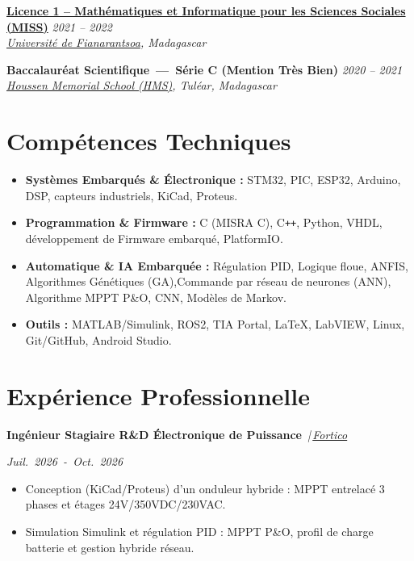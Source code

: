 \documentclass[10pt, a4paper]{article}
\newcommand{\cventry}[4]{%
    \noindent\textbf{#1} \hfill \textit{#2} \\
    \textit{#3} \hfill {\footnotesize #4} \vspace{0.2ex}
}
\newcommand{\experience}[3]{%
    \noindent
    \parbox[t]{0.72\textwidth}{\textbf{#1} \textit{\,|\,#2}}%
    \hfill
    \parbox[t]{0.26\textwidth}{\raggedleft\normalfont\itshape\mbox{#3}}%
    \par\vspace{0.2ex}
}
\begin{document}
\cventry{\href{https://facsciences.univ-fianarantsoa.mg/fr/formations/parcours/vorhf2gwn3pfzqta7w2pff6p}{Licence 1 -- Mathématiques et Informatique pour les Sciences Sociales (MISS)}}{2021 -- 2022}
{\href{https://www.univ-fianarantsoa.mg/}{Université de Fianarantsoa}, Madagascar}{}
\vspace{0.6ex}

\cventry{\textcolor{primary}{Baccalauréat Scientifique\ \textbf{---}\ Série C \textnormal{(Mention Très Bien)}}}{2020 -- 2021}
{\href{https://www.facebook.com/p/Coll\%C3\%A8ge-Priv\%C3\%A9-Houssen-Memorial-School-61557463046217/}{Houssen Memorial School (HMS)}, Tuléar, Madagascar}{}






\section*{Compétences Techniques}
\begin{itemize}[leftmargin=*, itemsep=0.2ex, parsep=0pt]
	\item \textbf{Systèmes Embarqués \& Électronique :} STM32, PIC, ESP32, Arduino, DSP, capteurs industriels, KiCad, Proteus.
	\item \textbf{Programmation \& Firmware :} C (MISRA C), C\texttt{++}, Python, VHDL, développement de Firmware embarqué, PlatformIO.
	\item \textbf{Automatique \& IA Embarquée :} Régulation PID, Logique floue, ANFIS, Algorithmes Génétiques (GA),Commande par réseau de neurones (ANN), Algorithme MPPT P\&O, CNN, Modèles de Markov.
	\item \textbf{Outils :} MATLAB/Simulink, ROS2, TIA Portal, LaTeX, LabVIEW, Linux, Git/GitHub, Android Studio.
\end{itemize}










\section*{Expérience Professionnelle}

\experience{Ingénieur Stagiaire R\&D Électronique de Puissance}{\href{https://sitewebfortico.vercel.app/fr}{Fortico}}{Juil. 2026 - Oct. 2026}
\begin{itemize}
	\item Conception (KiCad/Proteus) d'un onduleur hybride : MPPT entrelacé 3 phases et étages 24V/350VDC/230VAC.
	\item Simulation Simulink et régulation PID : MPPT P\&O, profil de charge batterie et gestion hybride réseau.
\end{itemize}
\end{document}
